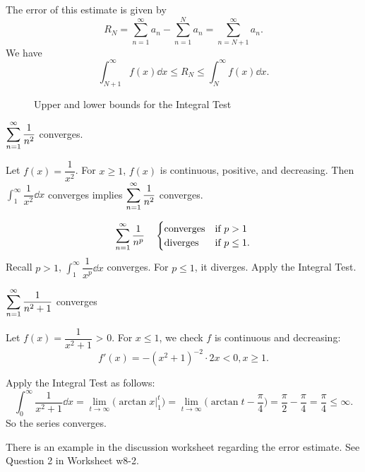 The error of this estimate is given by
    \[R_N = \sum_{n=1}^\infty a_n - \sum_{n=1}^N a_n = \sum_{n=N+1}^\infty a_n.\]
We have 
\[\int_{N+1}^\infty f(x) \dd x \leq R_N \leq \int_{N}^\infty f(x) \dd x.\]
\begin{figure}[h]
    \centering
    \resizebox{0.85\textwidth}{!}{
    
    \quad
    } %
    \label{fig:Riemann sums}
    \caption{Upper and lower bounds for the Integral Test}
\end{figure}





\begin{ex} $\displaystyle\sum_{n=1}^\infty \dfrac{1}{n^2}$ converges.

Let $f(x) = \dfrac{1}{x^2}$. For $x \geq 1$, $f(x)$ is continuous, positive, and decreasing. Then $\displaystyle \int_1^\infty \dfrac{1}{x^2} \dd x $ converges implies $\displaystyle\sum_{n=1}^\infty \dfrac{1}{n^2}$ converges.
\end{ex}

\begin{ex}
\begin{align*}
    \displaystyle\sum_{n=1}^\infty  \dfrac{1}{n^p} \quad \begin{cases} 
    \text{converges}  & \text{if } p > 1 \\
    \text{diverges} & \text{if } p \leq 1.
\end{cases}
\end{align*}
Recall $p > 1$, $\int_1^\infty \dfrac{1}{x^p} \dd x$ converges. For $p \leq 1$, it diverges. Apply the Integral Test.
\end{ex}

\begin{ex}
    $\displaystyle\sum_{n=1}^\infty  \dfrac{1}{n^2+1} $ converges
\end{ex}
Let $f(x) = \dfrac{1}{x^2+1}$ > 0. For $x \leq 1$, we check $f$ is continuous and decreasing: 
\[f'(x) = -(x^2+1)^{-2} \cdot 2x < 0, x \geq 1.\]

Apply the Integral Test as follows:
\[\int_0^\infty \dfrac{1}{x^2+1} \dd x = \lim_{t \to \infty} \Big(\arctan x |_1^t \Big) = \lim_{t \to \infty} \Big(\arctan t - \dfrac{\pi}{4} \Big) = \dfrac{\pi}{2}- \dfrac{\pi}{4} = \dfrac{\pi}{4} \leq \infty.\]
So the series converges.

\begin{ex}
    There is an example in the discussion worksheet regarding the error estimate. See Question 2 in Worksheet w8-2.
\end{ex}



